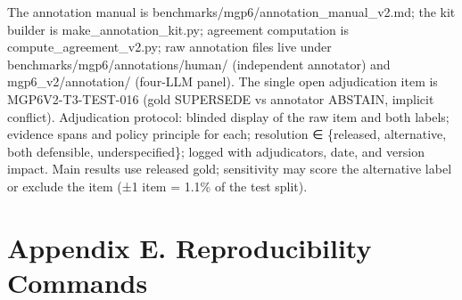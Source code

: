 The annotation manual is benchmarks/mgp6/annotation\_manual\_v2.md; the
kit builder is make\_annotation\_kit.py; agreement computation is
compute\_agreement\_v2.py; raw annotation files live under
benchmarks/mgp6/annotations/human/ (independent annotator) and
mgp6\_v2/annotation/ (four-LLM panel). The single open adjudication item
is MGP6V2-T3-TEST-016 (gold SUPERSEDE vs annotator ABSTAIN, implicit
conflict). Adjudication protocol: blinded display of the raw item and
both labels; evidence spans and policy principle for each; resolution ∈
\{released, alternative, both defensible, underspecified\}; logged with
adjudicators, date, and version impact. Main results use released gold;
sensitivity may score the alternative label or exclude the item (±1 item
= 1.1\% of the test split).

\section{Appendix E. Reproducibility
Commands}\label{appendix-e.-reproducibility-commands}

